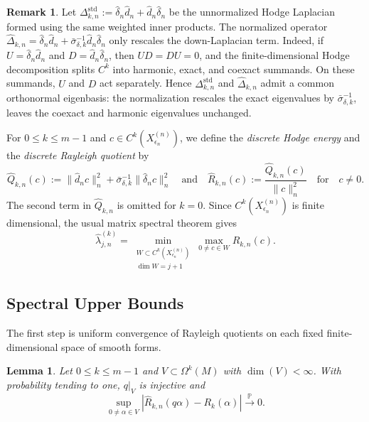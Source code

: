 \documentclass[11pt,reqno]{amsproc}
\numberwithin{equation}{section}
\newcommand{\PP}{\mathbb{P}}
\newcommand{\hd}{\hat{d}}
\newcommand{\hdelta}{\hat{\delta}}
\newtheorem{lemma}[counter]{Lemma}
\newcommand{\andd}{\quad \text{and} \quad}
\theoremstyle{definition}
\newtheorem{remark}[counter]{Remark}
\theoremstyle{plain}
\begin{document}
\begin{remark}
Let $\Delta^{\mathrm{std}}_{k,n}:=\hat\delta_n\hat d_n+\hat d_n\hat\delta_n$
be the unnormalized Hodge Laplacian formed using the same weighted inner products. The normalized operator $
\widehat\Delta_{k,n}
=\hat\delta_n\hat d_n+\bar{\sigma}_{\delta,k}^{-1}\hat d_n\hat\delta_n$
only rescales the down-Laplacian term. Indeed, if
$U=\hat\delta_n\hat d_n$ and $D=\hat d_n\hat\delta_n$, then
$UD=DU=0$, and the finite-dimensional Hodge decomposition splits \(C^k\) into harmonic,
exact, and coexact summands. On these summands, \(U\) and \(D\) act separately. Hence
\(\Delta^{\mathrm{std}}_{k,n}\) and \(\widehat\Delta_{k,n}\) admit a common orthonormal eigenbasis:
the normalization rescales the exact eigenvalues by \(\bar{\sigma}_{\delta,k}^{-1}\), leaves the
coexact and harmonic eigenvalues unchanged.
\end{remark}
    For $0\leq k\leq m-1$ and $c\in C^k(X^{(n)}_{\epsilon_n})$, we define the \emph{discrete Hodge energy} and the \emph{discrete Rayleigh quotient} by
    \begin{equation} \label{eq:discrete_hodge_energy_sec7}
        \widehat Q_{k,n}(c)
        :=
        \|\hd_n c\|_n^2
        +
        \bar{\sigma}_{\delta,k}^{-1}\|\hdelta_n c\|_n^2 \andd \widehat R_{k,n}(c):=\frac{\widehat Q_{k,n}(c)}{\|c\|_n^2}
        \quad \text{for} \quad  c\neq 0.
    \end{equation}
    \label{not:discrete_hodge_energy}
    The second term in $\widehat{Q}_{k,n}$ is omitted for $k=0$.  
    Since $C^k(X^{(n)}_{\epsilon_n})$ is finite dimensional, the usual matrix spectral theorem gives
    \begin{equation} \label{eq:discrete_minmax_sec7}
        \widehat\lambda^{(k)}_{j,n}
        =
        \min_{\substack{W\subset C^k(X^{(n)}_{\epsilon_n})\\ \dim W=j+1}}
        \max_{0\neq c\in W}\widehat R_{k,n}(c).
    \end{equation}



    \subsection{Spectral Upper Bounds}

    The first step is uniform convergence of Rayleigh quotients on each fixed finite-dimensional space of smooth forms.

    \begin{lemma} \label{lem:finite_dimensional_rayleigh_sec7}
    Let $0\leq k\leq m-1$ and $V\subset \Omega^k(M)$ with $\dim(V) < \infty$. With probability tending to one, $q|_V$ is injective and
    \begin{equation} \label{eq:finite_dimensional_rayleigh_sec7}
        \sup_{0\neq \alpha\in V}
        \left|\widehat R_{k,n}(q\alpha)-R_k(\alpha)\right|
        \xrightarrow{\PP}0.
    \end{equation}
    \end{lemma}
\end{document}

